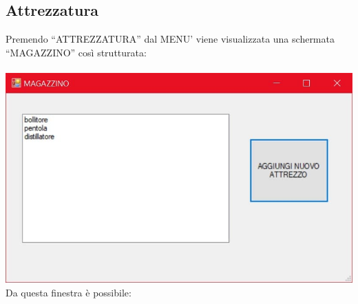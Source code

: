 \documentclass[a4paper, titlepage]{article}
\begin{document}
\subsection{Attrezzatura}
Premendo “ATTREZZATURA” dal MENU’ viene visualizzata una schermata “MAGAZZINO” così strutturata:\\\\
\includegraphics[scale=0.30]{Immagini/form/Form GestioneAttrezzatura.jpg}
\\Da questa finestra è possibile:
\end{document}
